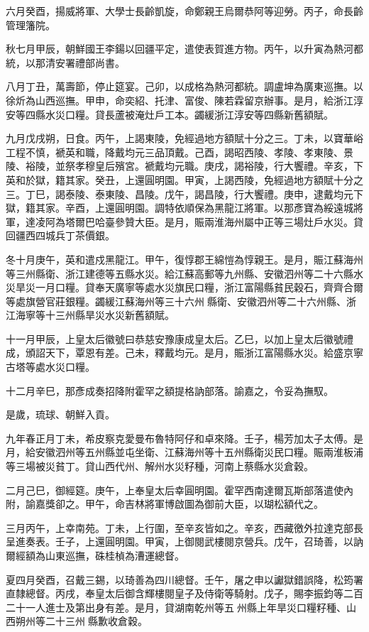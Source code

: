 \begin{pinyinscope}
六月癸酉，揚威將軍、大學士長齡凱旋，命鄭親王烏爾恭阿等迎勞。丙子，命長齡管理籓院。

秋七月甲辰，朝鮮國王李鍚以回疆平定，遣使表賀進方物。丙午，以升寅為熱河都統，以那清安署禮部尚書。

八月丁丑，萬壽節，停止筵宴。己卯，以成格為熱河都統。調盧坤為廣東巡撫。以徐炘為山西巡撫。甲申，命奕紹、托津、富俊、陳若霖留京辦事。是月，給浙江淳安等四縣水災口糧。貸長蘆被淹灶戶工本。蠲緩浙江淳安等四縣新舊額賦。

九月戊戌朔，日食。丙午，上謁東陵，免經過地方額賦十分之三。丁未，以寶華峪工程不慎，褫英和職，降戴均元三品頂戴。己酉，謁昭西陵、孝陵、孝東陵、景陵、裕陵，並祭孝穆皇后殯宮。褫戴均元職。庚戌，謁裕陵，行大饗禮。辛亥，下英和於獄，籍其家。癸丑，上還圓明園。甲寅，上謁西陵，免經過地方額賦十分之三。丁巳，謁泰陵、泰東陵、昌陵。戊午，謁昌陵，行大饗禮。庚申，逮戴均元下獄，籍其家。辛酉，上還圓明園。調特依順保為黑龍江將軍。以那彥寶為綏遠城將軍，達凌阿為塔爾巴哈臺參贊大臣。是月，賑兩淮海州屬中正等三場灶戶水災。貸回疆西四城兵丁茶價銀。

冬十月庚午，英和遣戍黑龍江。甲午，復惇郡王綿愷為惇親王。是月，賑江蘇海州等三州縣衛、浙江建德等五縣水災。給江蘇高郵等九州縣、安徽泗州等二十六縣水災旱災一月口糧。貸奉天廣寧等處水災旗民口糧，浙江富陽縣貧民穀石，齊齊合爾等處旗營官莊銀糧。蠲緩江蘇海州等三十六州縣衛、安徽泗州等二十六州縣、浙江海寧等十三州縣旱災水災新舊額賦。

十一月甲辰，上皇太后徽號曰恭慈安豫康成皇太后。乙巳，以加上皇太后徽號禮成，頒詔天下，覃恩有差。己未，釋戴均元。是月，賑浙江富陽縣水災。給盛京寧古塔等處水災口糧。

十二月辛巳，那彥成奏招降附霍罕之額提格訥部落。諭嘉之，令妥為撫馭。

是歲，琉球、朝鮮入貢。

九年春正月丁未，希皮察克愛曼布魯特阿仔和卓來降。壬子，楊芳加太子太傅。是月，給安徽泗州等五州縣並屯坐衛、江蘇海州等十五州縣衛災民口糧。賑兩淮板浦等三場被災貧丁。貸山西代州、解州水災籽種，河南上蔡縣水災倉穀。

二月己巳，御經筵。庚午，上奉皇太后幸圓明園。霍罕西南達爾瓦斯部落遣使內附，諭嘉獎卻之。甲午，命吉林將軍博啟圖為御前大臣，以瑚松額代之。

三月丙午，上幸南苑。丁未，上行圍，至辛亥皆如之。辛亥，西藏徼外拉達克部長呈進奏表。壬子，上還圓明園。甲寅，上御閱武樓閱京營兵。戊午，召琦善，以訥爾經額為山東巡撫，硃桂楨為漕運總督。

夏四月癸酉，召戴三錫，以琦善為四川總督。壬午，屠之申以讞獄錯誤降，松筠署直隸總督。丙戌，奉皇太后御含輝樓閱皇子及侍衛等騎射。戊子，賜李振鈞等二百二十一人進士及第出身有差。是月，貸湖南乾州等五州縣上年旱災口糧籽種、山西朔州等二十三州縣歉收倉穀。


\end{pinyinscope}
